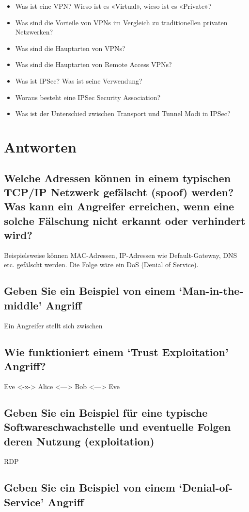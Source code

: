 \begin{itemize}
    \item Was ist eine VPN? Wieso ist es «Virtual», wieso ist es «Private»?
    \item Was sind die Vorteile von VPNs im Vergleich zu traditionellen privaten Netzwerken?
    \item Was sind die Hauptarten von VPNs?
    \item Was sind die Hauptarten von Remote Access VPNs?
    \item Was ist IPSec? Was ist seine Verwendung?
    \item Woraus besteht eine IPSec Security Association?
    \item Was ist der Unterschied zwischen Transport und Tunnel Modi in IPSec?
\end{itemize}

\section{Antworten}
\subsection*{Welche Adressen können in einem typischen TCP/IP Netzwerk gefälscht (spoof) werden? Was kann ein Angreifer erreichen, wenn eine solche Fälschung nicht erkannt oder verhindert wird?}
Beispielsweise können MAC-Adressen, IP-Adressen wie Default-Gateway, DNS etc. gefälscht werden. Die Folge wäre ein DoS (Denial of Service).
\subsection*{Geben Sie ein Beispiel von einem ‘Man-in-the-middle’ Angriff}
Ein Angreifer stellt sich zwischen
\subsection*{Wie funktioniert einem ‘Trust Exploitation’ Angriff?}
Eve <-x-> Alice <---> Bob <---> Eve
\subsection*{Geben Sie ein Beispiel für eine typische Softwareschwachstelle und eventuelle Folgen deren Nutzung (exploitation)}
RDP
\subsection*{Geben Sie ein Beispiel von einem ‘Denial-of-Service’ Angriff}

